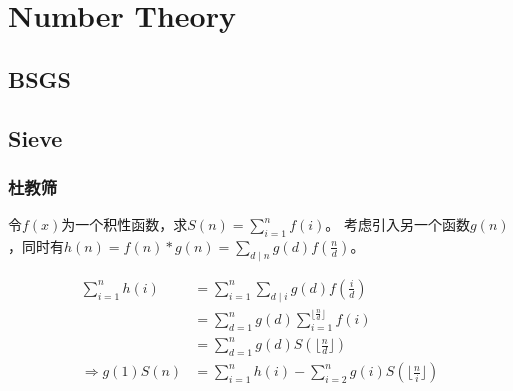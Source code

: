 \chapter{Number Theory}

\section{BSGS}




\section{Sieve}
\subsection{杜教筛}
令$f(x)$为一个积性函数，求$S(n)=\sum_{i=1}^{n}f(i)$。
考虑引入另一个函数$g(n)$，同时有$h(n)=f(n)*g(n)=\sum_{d \mid n}g(d)f(\frac{n}{d})$。

\[
  \begin{aligned}
    \sum_{i=1}^{n}{h(i)}
    & = \sum_{i=1}^{n}\sum_{d \mid i}{g(d)f(\frac{i}{d})} \\
    & = \sum_{d=1}^{n}{g(d)}\sum_{i=1}^{\lfloor \frac{n}{d} \rfloor}{f(i)} \\
    & = \sum_{d=1}^{n}{g(d)S(\lfloor \frac{n}{d} \rfloor)} \\
    \Rightarrow 
    g(1)S(n) 
    & = \sum_{i=1}^{n}{h(i)}-\sum_{i=2}^{n}{g(i)S(\lfloor \frac{n}{i} \rfloor)}
  \end{aligned}
\]

